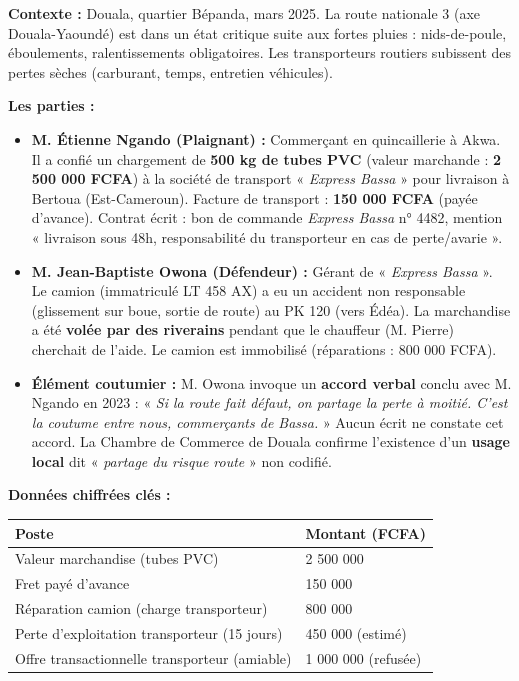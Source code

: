 \documentclass[11pt]{article}
\newcounter{popsec}
\newcounter{popsub}
\newcommand{\courssub}[1]{%
  \stepcounter{popsub}%
  \par\vspace{9pt}\noindent{\popxbold\fontsize{11.5}{13}\selectfont\color{popink}{\color{poporange}\thepopsec.\thepopsub}\hspace{6pt}#1}\par\nopagebreak\vspace{4pt}
}
\begin{document}
\courssub{Situation}
\textbf{Contexte :} Douala, quartier Bépanda, mars 2025. La route nationale 3 (axe Douala-Yaoundé) est dans un état critique suite aux fortes pluies : nids-de-poule, éboulements, ralentissements obligatoires. Les transporteurs routiers subissent des pertes sèches (carburant, temps, entretien véhicules).

\textbf{Les parties :}
\begin{itemize}
    \item \textbf{M. Étienne Ngando (Plaignant) :} Commerçant en quincaillerie à Akwa. Il a confié un chargement de \textbf{500 kg de tubes PVC} (valeur marchande : \textbf{2 500 000 FCFA}) à la société de transport « \textit{Express Bassa} » pour livraison à Bertoua (Est-Cameroun). Facture de transport : \textbf{150 000 FCFA} (payée d'avance). Contrat écrit : bon de commande \textit{Express Bassa} n° 4482, mention « livraison sous 48h, responsabilité du transporteur en cas de perte/avarie ».
    \item \textbf{M. Jean-Baptiste Owona (Défendeur) :} Gérant de « \textit{Express Bassa} ». Le camion (immatriculé LT 458 AX) a eu un accident non responsable (glissement sur boue, sortie de route) au PK 120 (vers Édéa). La marchandise a été \textbf{volée par des riverains} pendant que le chauffeur (M. Pierre) cherchait de l'aide. Le camion est immobilisé (réparations : 800 000 FCFA).
    \item \textbf{Élément coutumier :} M. Owona invoque un \textbf{accord verbal} conclu avec M. Ngando en 2023 : « \textit{Si la route fait défaut, on partage la perte à moitié. C'est la coutume entre nous, commerçants de Bassa.} » Aucun écrit ne constate cet accord. La Chambre de Commerce de Douala confirme l'existence d'un \textbf{usage local} dit « \textit{partage du risque route} » non codifié.
\end{itemize}

\textbf{Données chiffrées clés :}
\begin{center}
\begin{tabularx}{\linewidth}{|l|X|}\hline
\textbf{Poste} & \textbf{Montant (FCFA)} \\ \hline
Valeur marchandise (tubes PVC) & 2 500 000 \\
Fret payé d'avance & 150 000 \\
Réparation camion (charge transporteur) & 800 000 \\
Perte d'exploitation transporteur (15 jours) & 450 000 (estimé) \\
Offre transactionnelle transporteur (amiable) & 1 000 000 (refusée) \\ \hline
\end{tabularx}
\end{center}
\end{document}

